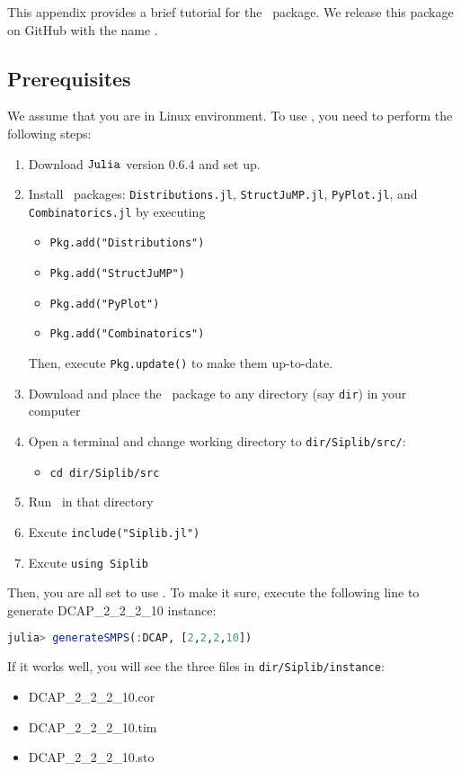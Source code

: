 This appendix provides a brief tutorial for the \julia\ package. We release this package on GitHub with the name \siplibjl.

\subsection{Prerequisites}
We assume that you are in Linux environment. To use \siplibjl, you need to perform the following steps:
\begin{enumerate}
	\item Download $\texttt{Julia}$ version 0.6.4 and set up.
	\item Install \julia\ packages: \texttt{Distributions.jl}, \texttt{StructJuMP.jl}, \texttt{PyPlot.jl}, and \texttt{Combinatorics.jl} by executing
	\begin{itemize}
		\item \texttt{Pkg.add("Distributions")}
		\item \texttt{Pkg.add("StructJuMP")}
		\item \texttt{Pkg.add("PyPlot")}
		\item \texttt{Pkg.add("Combinatorics")}
		
	\end{itemize}
	Then, execute \texttt{Pkg.update()} to make them up-to-date.
	\item Download and place the \siplibjl\ package to any directory (say \texttt{dir}) in your computer
	\item Open a terminal and change working directory to \texttt{dir/Siplib/src/}:
	\begin{itemize}
		\item \texttt{cd dir/Siplib/src}	
	\end{itemize}
	\item Run \julia\ in that directory
	\item Excute \texttt{include("Siplib.jl")}
	\item Excute \texttt{using Siplib}
\end{enumerate}
Then, you are all set to use \siplibjl. To make it sure, execute the following line to generate DCAP\_2\_2\_2\_10 instance:
\begin{lstlisting}[frame=single,language=julia]
julia> generateSMPS(:DCAP, [2,2,2,10])
\end{lstlisting}
If it works well, you will see the three files in \texttt{dir/Siplib/instance}:
\begin{itemize}
	\item DCAP\_2\_2\_2\_10.cor
	\item DCAP\_2\_2\_2\_10.tim
	\item DCAP\_2\_2\_2\_10.sto
\end{itemize}


